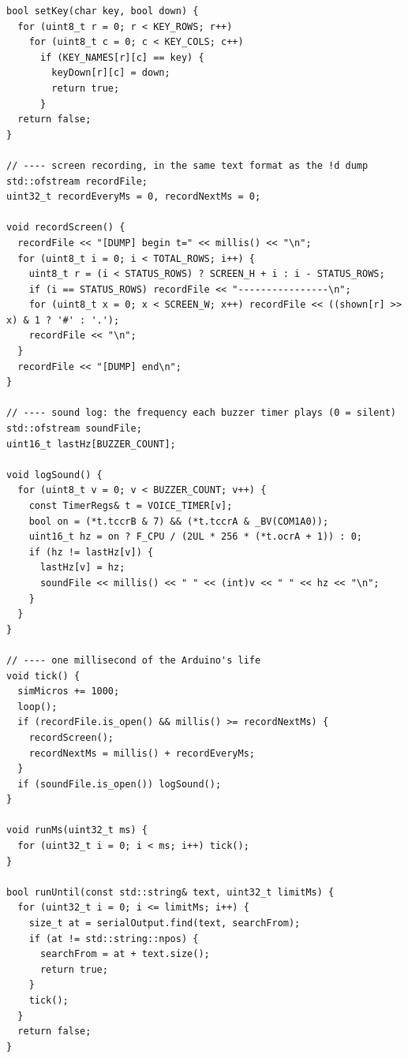 \documentclass[11pt,a4paper]{article}
\begin{document}
\begin{latin}
\begin{lstlisting}[language=Arduino]
bool setKey(char key, bool down) {
  for (uint8_t r = 0; r < KEY_ROWS; r++)
    for (uint8_t c = 0; c < KEY_COLS; c++)
      if (KEY_NAMES[r][c] == key) {
        keyDown[r][c] = down;
        return true;
      }
  return false;
}

// ---- screen recording, in the same text format as the !d dump
std::ofstream recordFile;
uint32_t recordEveryMs = 0, recordNextMs = 0;

void recordScreen() {
  recordFile << "[DUMP] begin t=" << millis() << "\n";
  for (uint8_t i = 0; i < TOTAL_ROWS; i++) {
    uint8_t r = (i < STATUS_ROWS) ? SCREEN_H + i : i - STATUS_ROWS;
    if (i == STATUS_ROWS) recordFile << "----------------\n";
    for (uint8_t x = 0; x < SCREEN_W; x++) recordFile << ((shown[r] >> x) & 1 ? '#' : '.');
    recordFile << "\n";
  }
  recordFile << "[DUMP] end\n";
}

// ---- sound log: the frequency each buzzer timer plays (0 = silent)
std::ofstream soundFile;
uint16_t lastHz[BUZZER_COUNT];

void logSound() {
  for (uint8_t v = 0; v < BUZZER_COUNT; v++) {
    const TimerRegs& t = VOICE_TIMER[v];
    bool on = (*t.tccrB & 7) && (*t.tccrA & _BV(COM1A0));
    uint16_t hz = on ? F_CPU / (2UL * 256 * (*t.ocrA + 1)) : 0;
    if (hz != lastHz[v]) {
      lastHz[v] = hz;
      soundFile << millis() << " " << (int)v << " " << hz << "\n";
    }
  }
}

// ---- one millisecond of the Arduino's life
void tick() {
  simMicros += 1000;
  loop();
  if (recordFile.is_open() && millis() >= recordNextMs) {
    recordScreen();
    recordNextMs = millis() + recordEveryMs;
  }
  if (soundFile.is_open()) logSound();
}

void runMs(uint32_t ms) {
  for (uint32_t i = 0; i < ms; i++) tick();
}

bool runUntil(const std::string& text, uint32_t limitMs) {
  for (uint32_t i = 0; i <= limitMs; i++) {
    size_t at = serialOutput.find(text, searchFrom);
    if (at != std::string::npos) {
      searchFrom = at + text.size();
      return true;
    }
    tick();
  }
  return false;
}


\end{lstlisting}
\end{latin}
\end{document}
